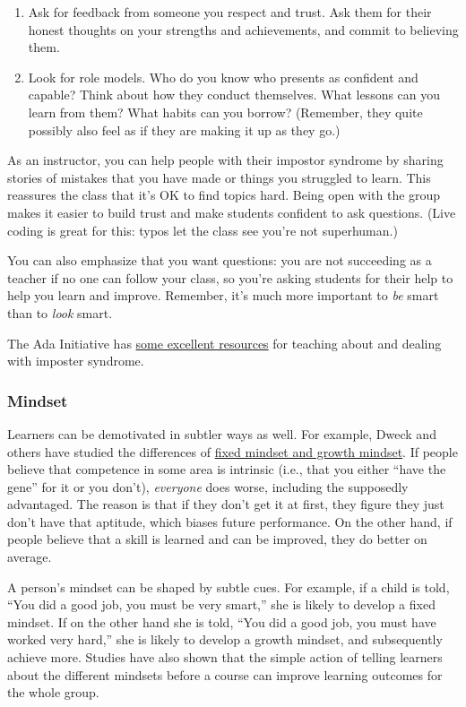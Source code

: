 \begin{enumerate}
\item
  Ask for feedback from someone you respect and trust. Ask them for
  their honest thoughts on your strengths and achievements, and commit
  to believing them.
\item
  Look for role models. Who do you know who presents as confident and
  capable? Think about how they conduct themselves. What lessons can you
  learn from them? What habits can you borrow? (Remember, they quite
  possibly also feel as if they are making it up as they go.)
\end{enumerate}

As an instructor, you can help people with their impostor syndrome by
sharing stories of mistakes that you have made or things you struggled
to learn. This reassures the class that it's OK to find topics hard.
Being open with the group makes it easier to build trust and make
students confident to ask questions. (Live coding is great for this:
typos let the class see you're not superhuman.)

You can also emphasize that you want questions: you are not succeeding
as a teacher if no one can follow your class, so you're asking students
for their help to help you learn and improve. Remember, it's much more
important to \emph{be} smart than to \emph{look} smart.

The Ada Initiative has
\href{http://adainitiative.org/continue-our-work/impostor-syndrome-training/}{some
excellent resources} for teaching about and dealing with imposter
syndrome.

\subsubsection{Mindset}\label{mindset}

Learners can be demotivated in subtler ways as well. For example, Dweck
and others have studied the differences of
\href{https://en.wikipedia.org/wiki/Mindset\#Fixed\_mindset\_and\_growth\_mindset}{fixed
mindset and growth mindset}. If people believe that competence in some
area is intrinsic (i.e., that you either ``have the gene'' for it or you
don't), \emph{everyone} does worse, including the supposedly advantaged.
The reason is that if they don't get it at first, they figure they just
don't have that aptitude, which biases future performance. On the other
hand, if people believe that a skill is learned and can be improved,
they do better on average.

A person's mindset can be shaped by subtle cues. For example, if a child
is told, ``You did a good job, you must be very smart,'' she is likely
to develop a fixed mindset. If on the other hand she is told, ``You did
a good job, you must have worked very hard,'' she is likely to develop a
growth mindset, and subsequently achieve more. Studies have also shown
that the simple action of telling learners about the different mindsets
before a course can improve learning outcomes for the whole group.

